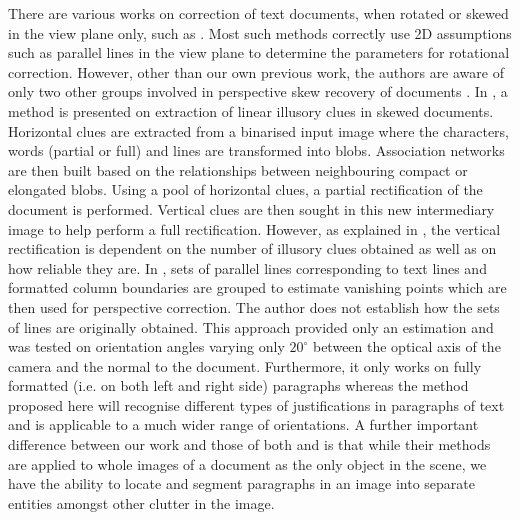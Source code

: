 \documentclass{elsart}   %
\begin{document}
There are various works on correction of text documents, when rotated or skewed
in the view plane only, such as \cite{Yu96,Amin96,docsthrucams,messelod1}. 
Most such methods correctly use 2D assumptions such as parallel lines in the
view plane to determine the parameters for rotational correction. However, other
than our own previous work, the authors are aware of only two other groups
involved in perspective skew recovery of documents \cite{pilucvpr1,dance02}. In 
\cite{pilucvpr1}, a method is presented on extraction of linear illusory clues 
in skewed documents. Horizontal clues are extracted from a binarised input image
where the characters, words (partial or full) and lines are transformed into
blobs. Association networks are then built based on the relationships between
neighbouring compact or elongated blobs. Using a pool of horizontal clues, a
partial rectification of the document is performed.  Vertical clues are then
sought in this new intermediary image to help perform a full
rectification. However, as explained in \cite{pilucvpr1}, the vertical
rectification is dependent on the number of illusory clues obtained as well as
on how reliable they are. In \cite{dance02}, sets of parallel lines
corresponding to text lines and formatted column boundaries are grouped to
estimate vanishing points which are then used for perspective correction.  The
author does not establish how the sets of lines are originally obtained.  This
approach provided only an estimation and was tested on orientation angles
varying only $20^\circ$ between the optical axis of the camera and the normal to
the document. Furthermore, it only works on fully formatted (i.e. on both left
and right side) paragraphs whereas the method proposed here will recognise
different types of justifications in paragraphs of text and is applicable to a
much wider range of orientations. A further important difference between our
work and those of both \cite{pilucvpr1} and \cite{dance02} is that while their
methods are applied to whole images of a document as the only object in the
scene, we have the ability to locate and segment paragraphs in an image into
separate entities amongst other clutter in the image.

\end{document}
